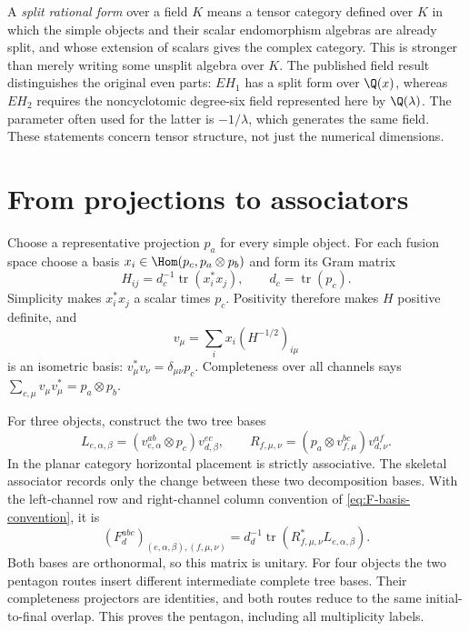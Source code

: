 A \emph{split rational form} over a field $K$ means a tensor
category defined over $K$ in which the simple objects and their
scalar endomorphism algebras are already split, and whose
extension of scalars gives the complex category. This is stronger
than merely writing some unsplit algebra over $K$. The published
field result distinguishes the original even parts: $EH_1$ has
a split form over $\Q(x)$, whereas $EH_2$ requires the
noncyclotomic degree-six field represented here by $\Q(\lambda)$.
The parameter often used for the latter is $-1/\lambda$, which
generates the same field. These statements concern tensor
structure, not just the numerical dimensions.

\section{From projections to associators}

Choose a representative projection $p_a$ for every simple object.
For each fusion space choose a basis
$x_i\in\Hom(p_c,p_a\otimes p_b)$ and form its Gram matrix
\[
 H_{ij}=d_c^{-1}\operatorname{tr}(x_i^*x_j),
 \qquad d_c=\operatorname{tr}(p_c).
\]
Simplicity makes $x_i^*x_j$ a scalar times $p_c$. Positivity
therefore makes $H$ positive definite, and
\[
 v_\mu=\sum_i x_i(H^{-1/2})_{i\mu}
\]
is an isometric basis: $v_\mu^*v_\nu=\delta_{\mu\nu}p_c$.
Completeness over all channels says
$\sum_{c,\mu}v_\mu v_\mu^*=p_a\otimes p_b$.

For three objects, construct the two tree bases
\[
 L_{e,\alpha,\beta}=(v^{ab}_{e,\alpha}\otimes p_c)
                         v^{ec}_{d,\beta},\qquad
 R_{f,\mu,\nu}=(p_a\otimes v^{bc}_{f,\mu})
                         v^{af}_{d,\nu}.
\]
In the planar category horizontal placement is strictly associative.
The skeletal associator records only the change between these two
decomposition bases. With the left-channel row and right-channel
column convention of \eqref{eq:F-basis-convention}, it is
\begin{equation}
 (F^{abc}_d)_{(e,\alpha,\beta),(f,\mu,\nu)}
 =d_d^{-1}\operatorname{tr}
           (R_{f,\mu,\nu}^*L_{e,\alpha,\beta}).
 \label{eq:EH-F-overlap}
\end{equation}
Both bases are orthonormal, so this matrix is unitary. For four
objects the two pentagon routes insert different intermediate
complete tree bases. Their completeness projectors are identities,
and both routes reduce to the same initial-to-final overlap.
This proves the pentagon, including all multiplicity labels.

